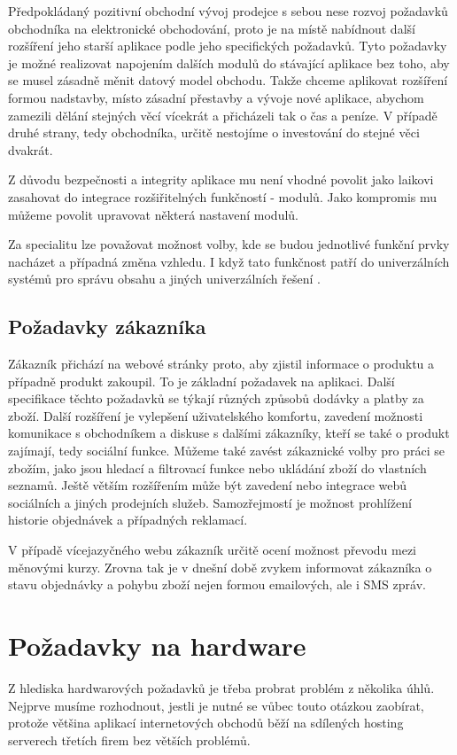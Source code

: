 \documentclass[11pt,twoside,a4paper]{book}
\begin{document}
Předpokládaný pozitivní obchodní vývoj prodejce s sebou nese rozvoj požadavků obchodníka na elektronické obchodování, proto je na místě nabídnout další rozšíření jeho starší aplikace podle jeho specifických požadavků. Tyto požadavky je možné realizovat napojením dalších modulů do stávající aplikace bez toho, aby se musel zásadně měnit datový model obchodu. Takže chceme aplikovat rozšíření formou nadstavby, místo zásadní přestavby a vývoje nové aplikace, abychom zamezili dělání stejných věcí vícekrát a přicházeli tak o čas a peníze. V případě druhé strany, tedy obchodníka, určitě nestojíme o investování do stejné věci dvakrát.

Z důvodu bezpečnosti a integrity aplikace mu není vhodné povolit jako laikovi zasahovat do integrace rozšiřitelných funkčností - modulů. Jako kompromis mu můžeme povolit upravovat některá nastavení modulů.

Za specialitu lze považovat možnost volby, kde se budou jednotlivé funkční prvky nacházet a případná změna vzhledu. I když tato funkčnost patří do univerzálních systémů pro správu obsahu a jiných univerzálních řešení .


\subsection{Požadavky zákazníka}
\label{potreby2}

Zákazník přichází na webové stránky proto, aby zjistil informace o produktu a případně produkt zakoupil. To je základní požadavek na aplikaci. Další specifikace těchto požadavků se týkají různých způsobů dodávky a platby za zboží. Další rozšíření je vylepšení uživatelského komfortu, zavedení možnosti komunikace s obchodníkem a diskuse s dalšími zákazníky, kteří se také o produkt zajímají, tedy sociální funkce. Můžeme také zavést zákaznické volby pro práci se zbožím, jako jsou hledací a filtrovací funkce nebo ukládání zboží do vlastních seznamů. Ještě větším rozšířením může být zavedení nebo integrace webů sociálních a jiných prodejních služeb. Samozřejmostí je možnost prohlížení historie objednávek a případných reklamací.

V případě vícejazyčného webu zákazník určitě ocení možnost převodu mezi měnovými kurzy. Zrovna tak je v dnešní době zvykem informovat zákazníka o stavu objednávky a pohybu zboží nejen formou emailových, ale i SMS zpráv.


\section{Požadavky na hardware}
Z hlediska hardwarových požadavků je třeba probrat problém z několika úhlů. Nejprve musíme rozhodnout, jestli je nutné se vůbec touto otázkou zaobírat, protože většina aplikací internetových obchodů běží na sdílených hosting serverech třetích firem bez větších problémů.
\end{document}
